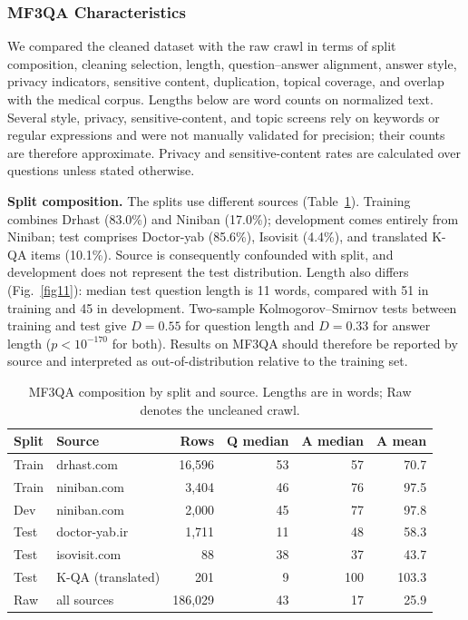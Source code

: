 \documentclass[manuscript,screen,review]{acmart}
\begin{document}
\subsubsection{MF3QA Characteristics}\label{subsubsec:mf3qa_analysis}

We compared the cleaned dataset with the raw crawl in terms of split composition, cleaning selection, length, question--answer alignment, answer style, privacy indicators, sensitive content, duplication, topical coverage, and overlap with the medical corpus. Lengths below are word counts on normalized text. Several style, privacy, sensitive-content, and topic screens rely on keywords or regular expressions and were not manually validated for precision; their counts are therefore approximate. Privacy and sensitive-content rates are calculated over questions unless stated otherwise.

\textbf{Split composition.} The splits use different sources (Table~\ref{tab:mf3qa_splits}). Training combines Drhast (83.0\%) and Niniban (17.0\%); development comes entirely from Niniban; test comprises Doctor-yab (85.6\%), Isovisit (4.4\%), and translated K-QA items (10.1\%). Source is consequently confounded with split, and development does not represent the test distribution. Length also differs (Fig.~\ref{fig11}): median test question length is 11 words, compared with 51 in training and 45 in development. Two-sample Kolmogorov--Smirnov tests between training and test give $D=0.55$ for question length and $D=0.33$ for answer length ($p<10^{-170}$ for both). Results on MF3QA should therefore be reported by source and interpreted as out-of-distribution relative to the training set.

\begin{table}[ht]
\caption{MF3QA composition by split and source. Lengths are in words; Raw denotes the uncleaned crawl.}\label{tab:mf3qa_splits}
\small
\begin{tabular}{@{}llrrrr@{}}
\toprule
Split & Source & Rows & Q median & A median & A mean \\
\midrule
Train & drhast.com & 16,596 & 53 & 57 & 70.7 \\
Train & niniban.com & 3,404 & 46 & 76 & 97.5 \\
Dev & niniban.com & 2,000 & 45 & 77 & 97.8 \\
Test & doctor-yab.ir & 1,711 & 11 & 48 & 58.3 \\
Test & isovisit.com & 88 & 38 & 37 & 43.7 \\
Test & K-QA (translated) & 201 & 9 & 100 & 103.3 \\
\midrule
Raw & all sources & 186,029 & 43 & 17 & 25.9 \\
\bottomrule
\end{tabular}
\end{table}
\end{document}
